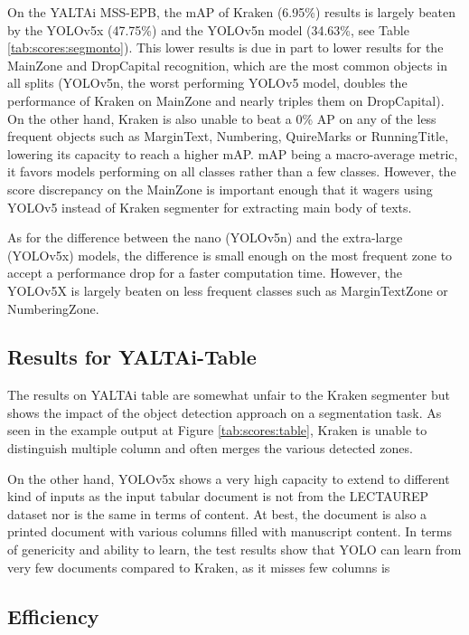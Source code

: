 \documentclass{jdmdh}
\begin{document}
On the YALTAi MSS-EPB, the mAP of Kraken (6.95\%) results is largely beaten by the YOLOv5x (47.75\%) and the YOLOv5n model (34.63\%, see Table \ref{tab:scores:segmonto}). This lower results is due in part to lower results for the MainZone and DropCapital recognition, which are the most common objects in all splits (YOLOv5n, the worst performing YOLOv5 model, doubles the performance of Kraken on MainZone and nearly triples them on DropCapital). On the other hand, Kraken is also unable to beat a 0\% AP on any of the less frequent objects such as MarginText, Numbering, QuireMarks or RunningTitle, lowering its capacity to reach a higher mAP. mAP being a macro-average metric, it favors models performing on all classes rather than a few classes. However, the score discrepancy on the MainZone is important enough that it wagers using YOLOv5 instead of Kraken segmenter for extracting main body of texts.

As for the difference between the nano (YOLOv5n) and the extra-large (YOLOv5x) models, the difference is small enough on the most frequent zone to accept a performance drop for a faster computation time. However, the YOLOv5X is largely beaten on less frequent classes such as MarginTextZone or NumberingZone.

\subsection{Results for YALTAi-Table}

The results on YALTAi table are somewhat unfair to the Kraken segmenter but shows the impact of the object detection approach on a segmentation task. As seen in the example output at Figure \ref{tab:scores:table}, Kraken is unable to distinguish multiple column and often merges the various detected zones. 

On the other hand, YOLOv5x shows a very high capacity to extend to different kind of inputs as the input tabular document is not from the LECTAUREP dataset nor is the same in terms of content. At best, the document is also a printed document with various columns filled with manuscript content. In terms of genericity and ability to learn, the test results show that YOLO can learn from very few documents compared to Kraken, as it misses few columns is

\subsection{Efficiency}
\end{document}
